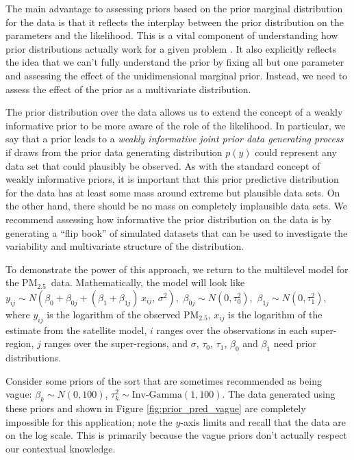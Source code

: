 \documentclass{statsoc}
\newcommand{\PM}{PM$_{2.5}$}
\begin{document}
The main advantage to assessing priors based on the prior marginal distribution
for the data is that it reflects the interplay between the prior distribution on
the parameters and the likelihood. This is a vital component of understanding
how prior distributions actually work for a given problem
\citep{gelman2017priors}. It also explicitly reflects the idea that we can't
fully understand the prior by fixing all but one parameter and assessing the
effect of the unidimensional marginal prior.  Instead, we need to assess the
effect of the prior as a multivariate distribution.

The prior distribution over the data allows us to extend the concept of a weakly
informative prior \citep{gelman2008weakly}  to be more aware of the role of the
likelihood. In particular, we say that a prior leads to a \emph{weakly
informative joint prior data generating process} if draws from the prior data
generating distribution $p(y)$ could represent any data set that could plausibly
be observed.  As with the standard concept of weakly informative priors, it is
important that this prior predictive distribution for the data has at least some
mass around extreme but plausible data sets. On the other hand, there should be
no mass on completely implausible data sets. We recommend assessing  how
informative the prior distribution on the data is by generating a ``flip book''
of simulated datasets that can be used to investigate the variability and
multivariate structure of the distribution.

To demonstrate the power of this approach, we return to the multilevel model for
the \PM\ data. Mathematically, the model will look like
$y_{ij} \sim N(\beta_0 + \beta_{0j} + (\beta_1 + \beta_{1j}) \, x_{ij}, \, \sigma^2),$
$\beta_{0j}  \sim N(0, \tau_0^2),$
$\beta_{1j} \sim N(0, \tau_1^2),$ 
where $y_{ij}$ is the logarithm of the observed \PM, $x_{ij}$ is the logarithm
of the estimate from the satellite model, $i$ ranges over the observations in
each super-region, $j$ ranges over the super-regions, and $\sigma$, $\tau_0$,
$\tau_1$, $\beta_0$ and $\beta_1$ need prior distributions.

Consider some priors of the sort that are sometimes recommended as being vague:
$\beta_k \sim N(0,100)$, $\tau_k^2 \sim \text{Inv-Gamma}(1,100)$. The data
generated using these priors and shown in Figure \ref{fig:prior_pred_vague} are
completely impossible for this application; note the $y$-axis limits and recall
that the data are on the log scale.  This is primarily because the vague priors
don't actually respect our contextual knowledge.
\end{document}
